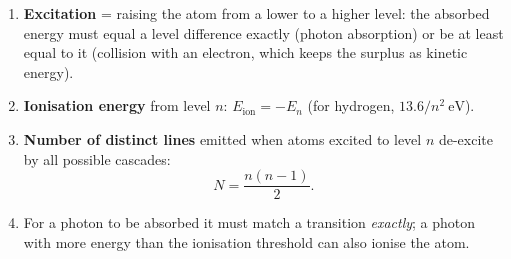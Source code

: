 \documentclass[11pt]{article}
\begin{document}
\begin{methode}
\begin{enumerate}
\item \textbf{Excitation} = raising the atom from a lower to a higher level: the absorbed energy must equal a level difference exactly (photon absorption) or be at least equal to it (collision with an electron, which keeps the surplus as kinetic energy).
\item \textbf{Ionisation energy} from level $n$: $E_{\text{ion}} = -E_n$ (for hydrogen, $13.6/n^2\ \mathrm{eV}$).
\item \textbf{Number of distinct lines} emitted when atoms excited to level $n$ de-excite by all possible cascades:
\[ N = \frac{n(n-1)}{2}. \]
\item For a photon to be absorbed it must match a transition \emph{exactly}; a photon with more energy than the ionisation threshold can also ionise the atom.
\end{enumerate}
\end{methode}
\end{document}

